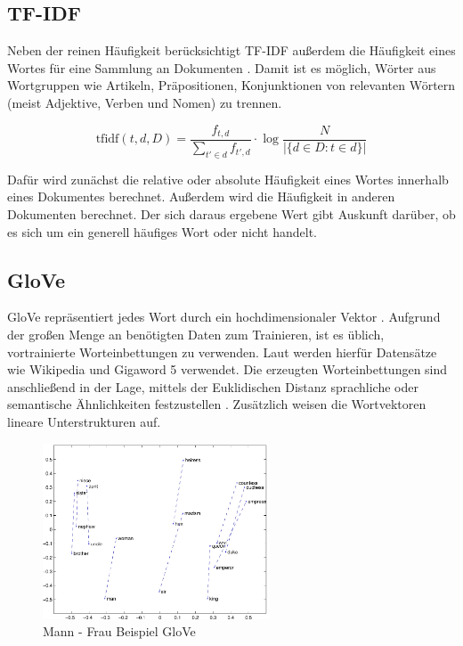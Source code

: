 \subsection*{\acl{TF-IDF}}

Neben der reinen Häufigkeit berücksichtigt \ac{TF-IDF} außerdem die Häufigkeit eines Wortes für eine Sammlung an Dokumenten \autocite[7]{kowsari_text_2019}. Damit ist es möglich, Wörter aus Wortgruppen wie Artikeln, Präpositionen, Konjunktionen von relevanten Wörtern (meist Adjektive, Verben und Nomen) zu trennen.

\[\mathrm{tfidf}(t,d,D) = \frac{f_{t,d}}{{\sum_{t' \in d}{f_{t',d}}}} \cdot \log \frac{N}{|\{d \in D: t \in d\}|}\]

Dafür wird zunächst die relative oder absolute Häufigkeit eines Wortes innerhalb eines Dokumentes berechnet. Außerdem wird die Häufigkeit in anderen Dokumenten berechnet. Der sich daraus ergebene Wert gibt Auskunft darüber, ob es sich um ein generell häufiges Wort oder nicht handelt.

\subsection*{GloVe}

\ac{GloVe} repräsentiert jedes Wort durch ein hochdimensionaler Vektor \autocite[8\psq]{kowsari_text_2019}. Aufgrund der großen Menge an benötigten Daten zum Trainieren, ist es üblich, vortrainierte Worteinbettungen zu verwenden. Laut \citeauthor{kowsari_text_2019} werden hierfür Datensätze wie Wikipedia und Gigaword \num{5} verwendet. Die erzeugten Worteinbettungen sind anschließend in der Lage, mittels der Euklidischen Distanz sprachliche oder semantische Ähnlichkeiten festzustellen \autocite{pennington_glove_2014}. Zusätzlich weisen die Wortvektoren lineare Unterstrukturen auf.

\begin{figure}[H]
  \centering
  \includegraphics[width=0.6\textwidth]{data/images/materials_and_methods/man_woman.jpg}
  \caption{Mann - Frau Beispiel \acs{GloVe} \autocite{pennington_glove_2014}} \label{fig:gloveExample}
\end{figure}

